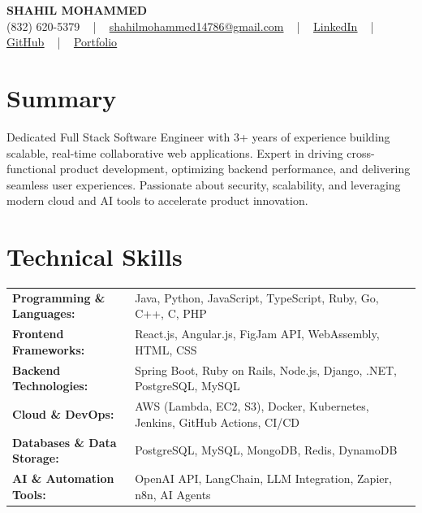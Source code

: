\documentclass[letterpaper,11pt]{article}
\begin{document}
\begin{center}
    {\fontsize{14pt}{12pt}\selectfont \textbf{\MakeUppercase{Shahil Mohammed}}}\\ \vspace{2pt}
    \fontsize{10pt}{12pt}\selectfont (832) 620-5379 ~ | ~ \href{mailto:shahilmohammed14786@gmail.com}{shahilmohammed14786@gmail.com} ~ | ~  
    \href{https://www.linkedin.com/in/shahil-mohammed-9652931a1/}{\color{blue}\underline{LinkedIn}}  ~ | ~ 
    \href{https://github.com/freakbeast14}{\color{blue}\underline{GitHub}} ~ | ~ 
    \href{https://shahil-mohammed.netlify.app/}{\color{blue}\underline{Portfolio}}
    \vspace{-8pt}
\end{center}

\section{Summary}
\fontsize{9pt}{10pt}\selectfont
Dedicated Full Stack Software Engineer with 3+ years of experience building scalable, real-time collaborative web applications. Expert in driving cross-functional product development, optimizing backend performance, and delivering seamless user experiences. Passionate about security, scalability, and leveraging modern cloud and AI tools to accelerate product innovation.
 \vspace{-5pt}
 
\section{Technical Skills}
        \vspace{-14pt}
        \begin{table}[h]
            \fontsize{9pt}{10pt}\selectfont
            \begin{tabular}{p{0.3\linewidth} p{0.7\linewidth}}
                \textbf{Programming \& Languages:} & Java, Python, JavaScript, TypeScript, Ruby, Go, C++, C, PHP \\
                \textbf{Frontend Frameworks:} & React.js, Angular.js, FigJam API, WebAssembly, HTML, CSS \\
                \textbf{Backend Technologies:} & Spring Boot, Ruby on Rails, Node.js, Django, .NET, PostgreSQL, MySQL \\
                \textbf{Cloud \& DevOps:} & AWS (Lambda, EC2, S3), Docker, Kubernetes, Jenkins, GitHub Actions, CI/CD \\
                \textbf{Databases \& Data Storage:} & PostgreSQL, MySQL, MongoDB, Redis, DynamoDB \\
                \textbf{AI \& Automation Tools:} & OpenAI API, LangChain, LLM Integration, Zapier, n8n, AI Agents \\
            \end{tabular}
        \end{table}
 \vspace{-15pt}
 
\end{document}
